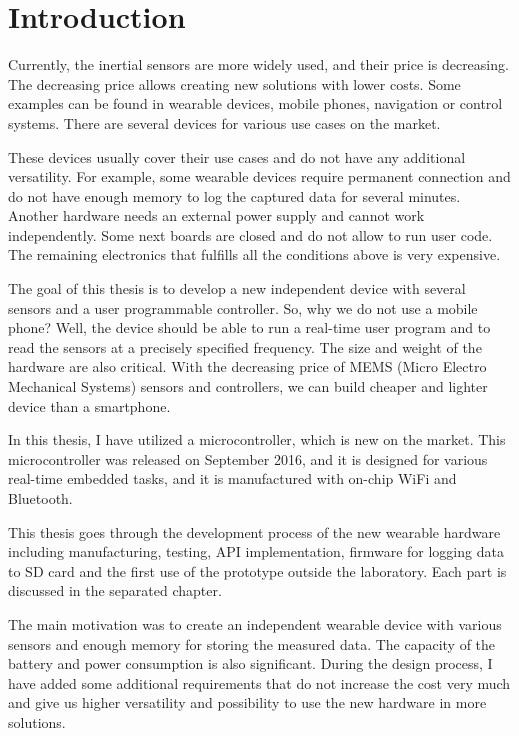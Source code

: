 \chapter{Introduction}
Currently, the inertial sensors are more widely used, and their price is decreasing. The decreasing price allows creating new solutions with lower costs. Some examples can be found in wearable devices, mobile phones, navigation or control systems. There are several devices for various use cases on the market.

These devices usually cover their use cases and do not have any additional versatility. For example, some wearable devices require permanent connection and do not have enough memory to log the captured data for several minutes. Another hardware needs an external power supply and cannot work independently. Some next boards are closed and do not allow to run user code. The remaining electronics that fulfills all the conditions above is very expensive.

The goal of this thesis is to develop a new independent device with several sensors and a user programmable controller. So, why we do not use a mobile phone? Well, the device should be able to run a real-time user program and to read the sensors at a precisely specified frequency. The size and weight of the hardware are also critical. With the decreasing price of MEMS (Micro Electro Mechanical Systems) sensors and controllers, we can build cheaper and lighter device than a smartphone.

In this thesis, I have utilized a microcontroller, which is new on the market. This microcontroller was released on September 2016, and it is designed for various real-time embedded tasks, and it is manufactured with on-chip WiFi and Bluetooth.

This thesis goes through the development process of the new wearable hardware including manufacturing, testing, API implementation, firmware for logging data to SD card and the first use of the prototype outside the laboratory. Each part is discussed in the separated chapter.

The main motivation was to create an independent wearable device with various sensors and enough memory for storing the measured data. The capacity of the battery and power consumption is also significant. During the design process, I have added some additional requirements that do not increase the cost very much and give us higher versatility and possibility to use the new hardware in more solutions.


